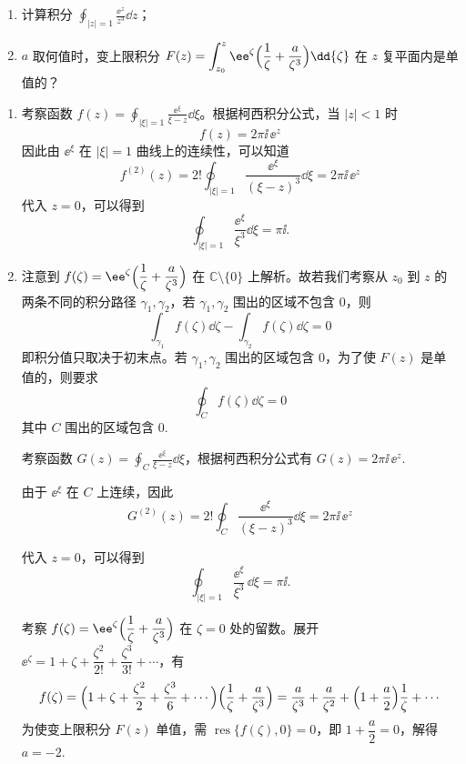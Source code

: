 \begin{question}
\begin{enumerate}
  \item 计算积分 \(\displaystyle \oint_{|z|=1} \frac{\ee^{z}}{z^3}\dd{z}\)；

  \item \(a\) 取何值时，变上限积分 \(\displaystyle F(z)=\int_{z_0}^{z} \ee^{\zeta}\Bigl(\frac1\zeta+\frac{a}{\zeta^3}\Bigr)\dd{\zeta}\) 在 \(z\) 复平面内是单值的？

\end{enumerate}
\begin{solution}
\begin{enumerate}
  \item 考察函数 \(f(z)=\displaystyle\oint_{|\xi|=1} \frac{\ee^{\xi}}{\xi-z}\dd{\xi}\)。根据柯西积分公式，当 \(|z|<1\) 时
\[ f(z)=2\pi\ii\,\ee^{z} \]
因此由 \(\ee^{\xi}\) 在 \(|\xi|=1\) 曲线上的连续性，可以知道
\[ f^{(2)}(z)=2! \oint_{|\xi|=1} \frac{\ee^{\xi}}{(\xi-z)^3}\dd{\xi} = 2\pi\ii\,\ee^{z} \]
代入 \(z=0\)，可以得到
\[ \oint_{|\xi|=1} \frac{\ee^{\xi}}{\xi^3}\dd{\xi} = \pi\ii.  \]

  \item 注意到 \(f(\zeta)=\ee^{\zeta}\Bigl(\dfrac1\zeta+\dfrac{a}{\zeta^3}\Bigr)\) 在 \(\mathbb{C}\setminus\{0\}\) 上解析。故若我们考察从 \(z_0\) 到 \(z\) 的两条不同的积分路径 \(\gamma_1,\gamma_2\)，若 \(\gamma_1,\gamma_2\) 围出的区域不包含 \(0\)，则
\[ \int_{\gamma_1} f(\zeta)\dd{\zeta}-\int_{\gamma_2} f(\zeta)\dd{\zeta} = 0 \]
即积分值只取决于初末点。若 \(\gamma_1,\gamma_2\) 围出的区域包含 \(0\)，为了使 \(F(z)\) 是单值的，则要求
\[ \oint_C f(\zeta)\dd{\zeta} = 0 \]
其中 \(C\) 围出的区域包含 \(0\).

考察函数 \(G(z)=\displaystyle\oint_C \frac{\ee^{\xi}}{\xi-z}\dd{\xi}\)，根据柯西积分公式有 \(G(z)=2\pi\ii\,\ee^{z}\).

由于 \(\ee^{\xi}\) 在 \(C\) 上连续，因此
\[ G^{(2)}(z)=2! \oint_C \frac{\ee^{\xi}}{(\xi-z)^3}\dd{\xi} = 2\pi\ii\,\ee^{z} \]

代入 \(z=0\)，可以得到
\[ \oint_{|\xi|=1} \frac{\ee^{\xi}}{\xi^3}\,\dd{\xi} = \pi\ii. \]

考察 \(f(\zeta)=\ee^{\zeta}\Bigl(\dfrac1\zeta+\dfrac{a}{\zeta^3}\Bigr)\) 在 \(\zeta=0\) 处的留数。展开 \(\ee^{\zeta}=1+\zeta+\dfrac{\zeta^2}{2!}+\dfrac{\zeta^3}{3!}+\cdots\)，有
\[
f(\zeta)=\Bigl(1+\zeta+\frac{\zeta^2}{2}+\frac{\zeta^3}{6}+\cdots\Bigr)\Bigl(\frac1\zeta+\frac{a}{\zeta^3}\Bigr)
=\frac{a}{\zeta^3}+\frac{a}{\zeta^2}+\Bigl(1+\frac{a}{2}\Bigr)\frac1\zeta+\cdots
\]
为使变上限积分 \(F(z)\) 单值，需 \(\operatorname{res}\{f(\zeta),0\}=0\)，即 \(1+\dfrac{a}{2}=0\)，解得 \(a=-2\).
\end{enumerate}
\end{solution}
\end{question}
